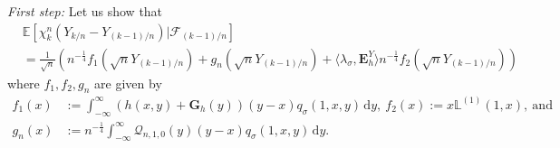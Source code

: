 \documentclass[12pt]{article}
\numberwithin{equation}{section}
\theoremstyle{definition}
\theoremstyle{remark}
\newcommand{\EE}{\mathbb{E}}
\newcommand{\cQ}{\mathcal{Q}}
\newcommand{\cF}{\mathcal{F}}
\newcommand{\vd}{\,\mathrm{d}}
\newcommand{\bfH}[1]{\mathbf{E}^Y_{#1}}
\newcommand{\bfG}[1]{\mathbf{G}_{#1}}
\newcommand{\Lm}[3]{\mathbb{L}^{(#2)}(#1,#3)}
\begin{document}
{\it First step:}
Let us show that 
\begin{equation}
\begin{split}
	& 
\EE\!\left[\chi_k^n (Y_{k/n} - Y_{(k-1)/n})  | \cF_{(k-1)/n}\right] 
	\\
	& = \frac1{\sqrt n}
\left(  n^{-\frac14} f_1(\sqrt{n} Y_{(k-1)/n}) + g_{n}(\sqrt{n} Y_{(k-1)/n}) + \langle \lambda_\sigma , \bfH h \rangle   n^{-\frac14} f_2(\sqrt{n} Y_{(k-1)/n})\right)
\end{split}
\end{equation}
where $f_1,f_2,g_n$ are given by 
\begin{equation}
\begin{split}
	f_1(x)& := \int_{-\infty}^\infty (h(x,y)+\bfG{h}(y)) (y-x) q_\sigma(1,x,y) \vd y , 
	\ f_2(x):= x \Lm{1}{1}{x}, \ \text{and}
	\\
	g_n(x) & := n^{-\frac14} \int_{-\infty}^\infty \cQ_{n,1,0}(y) (y-x) q_\sigma(1,x,y) \vd y.
\end{split}	
\end{equation}
\end{document}
